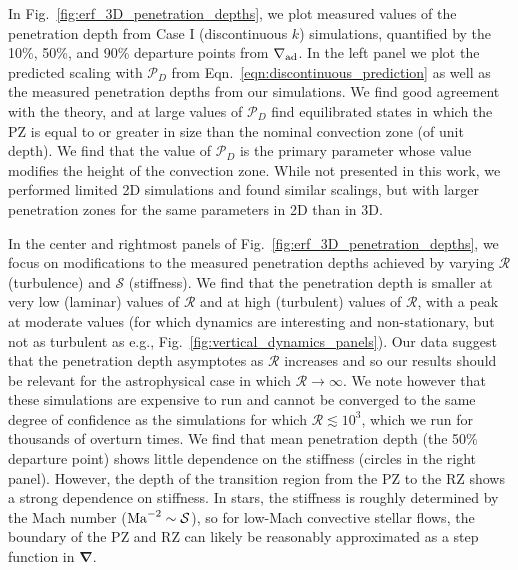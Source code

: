 \documentclass{aastex631}
\newcommand{\gradad}{\ensuremath{\nabla_{\rm{ad}}}}
\newcommand{\mP}{\ensuremath{\mathcal{P}}}
\newcommand{\mR}{\ensuremath{\mathcal{R}}}
\newcommand{\mS}{\ensuremath{\mathcal{S}}}
\renewcommand{\vec}[1]{\boldsymbol{#1}}
\newcommand{\grad}{\vec{\nabla}}
\begin{document}
In Fig.~\ref{fig:erf_3D_penetration_depths}, we plot measured values of the penetration depth from Case I (discontinuous $k$) simulations, quantified by the 10\%, 50\%, and 90\% departure points from $\gradad$.
In the left panel we plot the predicted scaling with $\mP_D$ from Eqn.~\ref{eqn:discontinuous_prediction} as well as the measured penetration depths from our simulations.
We find good agreement with the theory, and at large values of $\mP_D$ find equilibrated states in which the PZ is equal to or greater in size than the nominal convection zone (of unit depth).
We find that the value of $\mP_D$ is the primary parameter whose value modifies the height of the convection zone.
While not presented in this work, we performed limited 2D simulations and found similar scalings, but with larger penetration zones for the same parameters in 2D than in 3D.

In the center and rightmost panels of Fig.~\ref{fig:erf_3D_penetration_depths}, we focus on modifications to the measured penetration depths achieved by varying $\mR$ (turbulence) and $\mS$ (stiffness).
We find that the penetration depth is smaller at very low (laminar) values of $\mR$ and at high (turbulent) values of $\mR$, with a peak at moderate values (for which dynamics are interesting and non-stationary, but not as turbulent as e.g., Fig.~\ref{fig:vertical_dynamics_panels}).
Our data suggest that the penetration depth asymptotes as $\mR$ increases and so our results should be relevant for the astrophysical case in which $\mR \rightarrow \infty$.
We note however that these simulations are expensive to run and cannot be converged to the same degree of confidence as the simulations for which $\mR \lesssim 10^3$, which we run for thousands of overturn times.
We find that mean penetration depth (the 50\% departure point) shows little dependence on the stiffness (circles in the right panel).
However, the depth of the transition region from the PZ to the RZ shows a strong dependence on stiffness.
In stars, the stiffness is roughly determined by the Mach number ($\rm{Ma}^{-2} \sim \mS$), so for low-Mach convective stellar flows, the boundary of the PZ and RZ can likely be reasonably approximated as a step function in $\grad$.
\end{document}
